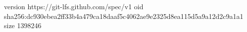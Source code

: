version https://git-lfs.github.com/spec/v1
oid sha256:dc930ebea2ff33b4a479ca18daaf5c4062ae9e2325d8ea115d5a9a12d2c9a1a1
size 1398246
